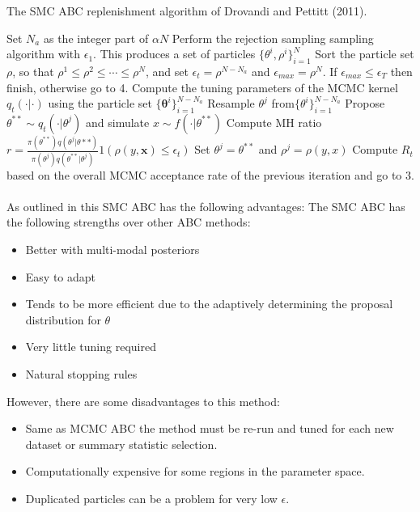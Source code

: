 \documentclass[12,fleqn]{article}
\theoremstyle{definition}
\theoremstyle{plain}
\begin{document}
\begin{algorithm}
\caption{The SMC ABC replenishment algorithm of Drovandi and Pettitt (2011).}
\begin{algorithmic}[1]
\State Set $N_a$ as the integer part of $\alpha N$
\State Perform the rejection sampling sampling algorithm with $\epsilon_1$. This produces a set of particles $\{ \theta^i, \rho^i \}^N_{i=1}$
\State Sort the particle set $\rho$, so that $\rho^1 \leq \rho^2 \leq \cdots \leq \rho^N$, and set $\epsilon_t = \rho^{N - N_a}$ and $\epsilon_{max} = \rho^N$. If $\epsilon_{max} \leq \epsilon_T$ then finish, otherwise go to 4.
\State Compute the tuning parameters of the MCMC kernel $q_t(\cdot | \cdot)$ using the particle set $\{ \boldsymbol{\theta}^i \}^{N - N_a}_{i = 1}$
\State Resample $\theta^j$ from$\{ \theta^i \}^{N - N_a}_{i = 1}$
\State Propose $\theta^{**} \sim q_t(\cdot | \theta^j)$ and simulate $x \sim f(\cdot|\theta^{**})$
\State Compute MH ratio $r = \frac{\pi(\theta^{**}) q(\theta^j|\theta**)}{\pi(\theta^j)q(\theta^{**}|\theta^j)} 1(\rho(y, \boldsymbol{x}) \leq \epsilon_t)$
\State Set $\theta^j = \theta^{**}$ and $\rho^j = \rho(y,x)$
\EndIf
\EndFor
\EndFor
\State Compute $R_t$ based on the overall MCMC acceptance rate of the previous iteration and go to 3.
\end{algorithmic}
\end{algorithm}

\paragraph{}
As outlined in  this SMC ABC has the following advantages:
The SMC ABC has the following strengths over other ABC methods:
\begin{itemize}
\item Better with multi-modal posteriors
\item Easy to adapt
\item Tends to be more efficient due to the adaptively determining the proposal distribution for $\theta$
\item Very little tuning required 
\item Natural stopping rules 
\end{itemize}
However, there are some disadvantages to this method:
\begin{itemize}
\item Same as MCMC ABC the method must be re-run and tuned for each new dataset or summary statistic selection.
\item Computationally expensive for some regions in the parameter space.
\item Duplicated particles can be a problem for very low $\epsilon$.
\end{itemize}
\par
\end{document}
